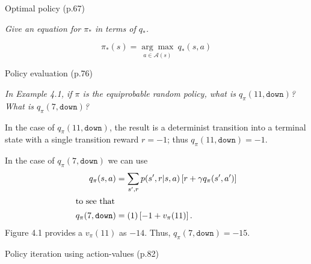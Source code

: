 \documentclass[12pt,letterpaper]{exam}
\newcommand{\chapter}{2}
\begin{document}
\begin{questions}
	\question%
	Optimal policy (p.67)

	\emph{Give an equation for \(\pi_*\) in terms of \(q_*\).}
	\begin{solution}
		\[\pi_*(s) = \underset{a\in\mathcal{A}(s)}{\arg\max} \ q_*(s,a)\]
	\end{solution}

	\setcounter{section}{4}
	\renewcommand\chapter{4}
	\setcounter{question}{1-1}%
	\question%
	Policy evaluation (p.76)

	\emph{In Example 4.1, if \(\pi\) is the equiprobable random policy, what is \(q_\pi(11, \texttt{down})\)? 
	What is \(q_\pi(7, \texttt{down})\)?}
	\begin{solution}
		In the case of \(q_\pi(11, \texttt{down})\), the result is a determinist transition into a terminal
		state with a single transition reward \(r = -1\); thus \(q_\pi(11, \texttt{down}) = -1\).
		
		In the case of \(q_\pi(7, \texttt{down})\) we can use
		\begin{align*}
			q_\pi(s,a) &= \sum_{s^\prime,r} p(s^\prime,r|s, a)\left[r+\gamma q_\pi(s^\prime,a^\prime) \right] \\
		\intertext{to see that}
			q_\pi(7, \texttt{down}) &= (1) \left[ -1 + v_\pi(11) \right].
		\end{align*}
		Figure 4.1 provides a \(v_\pi(11)\) as \(-14\).
		Thus, \(q_\pi(7, \texttt{down}) = -15\).
	\end{solution}

	\clearpage

	\setcounter{question}{5-1}%
	\question%
	Policy iteration using action-values (p.82)
	

\end{questions}
\end{document}
